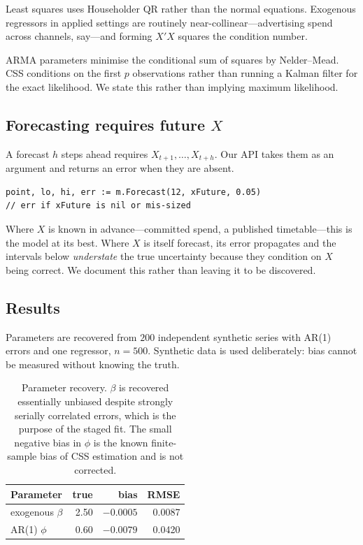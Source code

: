 \documentclass[10pt,twocolumn]{article}
\begin{document}
Least squares uses Householder QR rather than the normal equations. Exogenous
regressors in applied settings are routinely near-collinear---advertising spend
across channels, say---and forming $X'X$ squares the condition number.

ARMA parameters minimise the conditional sum of squares by Nelder--Mead. CSS
conditions on the first $p$ observations rather than running a Kalman filter for
the exact likelihood. We state this rather than implying maximum likelihood.

\subsection{Forecasting requires future $X$}

A forecast $h$ steps ahead requires $X_{t+1},\dots,X_{t+h}$. Our API takes them
as an argument and returns an error when they are absent.

\begin{lstlisting}
point, lo, hi, err := m.Forecast(12, xFuture, 0.05)
// err if xFuture is nil or mis-sized
\end{lstlisting}

Where $X$ is known in advance---committed spend, a published timetable---this is
the model at its best. Where $X$ is itself forecast, its error propagates and the
intervals below \emph{understate} the true uncertainty because they condition on
$X$ being correct. We document this rather than leaving it to be discovered.

\subsection{Results}

Parameters are recovered from $200$ independent synthetic series with AR(1)
errors and one regressor, $n=500$. Synthetic data is used deliberately: bias
cannot be measured without knowing the truth.

\begin{table}[h]\centering\small
\begin{tabular}{lrrr}
\toprule
Parameter & true & bias & RMSE \\
\midrule
exogenous $\beta$ & 2.50 & $-0.0005$ & 0.0087 \\
AR(1) $\phi$      & 0.60 & $-0.0079$ & 0.0420 \\
\bottomrule
\end{tabular}
\caption{Parameter recovery. $\beta$ is recovered essentially unbiased despite
strongly serially correlated errors, which is the purpose of the staged fit. The
small negative bias in $\phi$ is the known finite-sample bias of CSS estimation
and is not corrected.}
\end{table}
\end{document}
